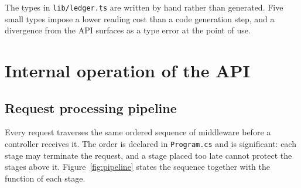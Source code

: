 \documentclass[11pt,a4paper]{article}
\newcommand{\code}[1]{\texttt{\fontsize{8.6}{10}\selectfont #1}}
\begin{document}
The types in \code{lib/ledger.ts} are written by hand rather than generated.
Five small types impose a lower reading cost than a code generation step, and a
divergence from the API surfaces as a type error at the point of use.

\section{Internal operation of the API}

\subsection{Request processing pipeline}

Every request traverses the same ordered sequence of middleware before a
controller receives it. The order is declared in \code{Program.cs} and is
significant: each stage may terminate the request, and a stage placed too late
cannot protect the stages above it. Figure~\ref{fig:pipeline} states the
sequence together with the function of each stage.
\end{document}
